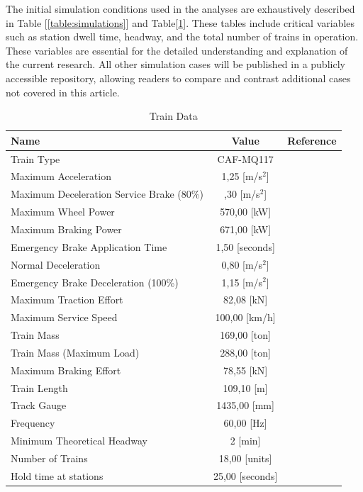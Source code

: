 \documentclass[conference]{IEEEtran}
\begin{document}
The initial simulation conditions used in the analyses are exhaustively described in Table [\ref{table:simulations}] and Table[\ref{table:train_data}]. These tables include critical variables such as station dwell time, headway, and the total number of trains in operation. These variables are essential for the detailed understanding and explanation of the current research. All other simulation cases will be published in a publicly accessible repository, allowing readers to compare and contrast additional cases not covered in this article.\cite{b12} 
\begin{table}[h]
\caption{Train Data}
\label{table:train_data}
\centering
\begin{tabular}{|p{4.5cm}|c|c|}
\hline
\rowcolor[gray]{0.9}
\centering Name & Value & \scriptsize Reference \\ 
\hline
Train Type & \scriptsize CAF-MQ117 & \cite{b10} \\
\hline
Maximum Acceleration & 1,25 [\scriptsize m/s$^2$]  & \cite{b11}  \\
\hline
Maximum Deceleration Service Brake \scriptsize(80\%)  & \centering 1,30 [\scriptsize m/s$^2$] & \cite{b11} \\
\hline
Maximum Wheel Power  & 570,00 [\scriptsize kW] & \cite{b12} \\
\hline
Maximum Braking Power  & 671,00 [\scriptsize kW] & \cite{b12} \\
\hline
Emergency Brake Application Time  & 1,50 [\scriptsize seconds] & \cite{b11} \\
\hline
Normal Deceleration & 0,80 [\scriptsize m/s$^2$]  & \cite{b11} \\
\hline
Emergency Brake Deceleration \scriptsize(100\%) & 1,15 [\scriptsize m/s$^2$]  & \cite{b11} \\
\hline
Maximum Traction Effort  & 82,08 [\scriptsize kN] & \cite{b12} \\
\hline
Maximum Service Speed & 100,00 [\scriptsize km/h] & \cite{b11} \\
\hline
Train Mass & 169,00 [\scriptsize ton]& \cite{b11} \\
\hline
Train Mass (Maximum Load) & 288,00 [\scriptsize ton] & \cite{b11} \\
\hline
Maximum Braking Effort & 78,55 [\scriptsize kN] & \cite{b12} \\
\hline
Train Length & 109,10 [\scriptsize m] & \cite{b11} \\
\hline
Track Gauge & 1435,00 \scriptsize[mm] & \cite{b11} \\
\hline
Frequency  & 60,00 \scriptsize[Hz] & \cite{b13} \\
\hline
Minimum Theoretical Headway  & 2 [\scriptsize min]& \cite{b14} \\
\hline
Number of Trains  & 18,00 [\scriptsize units] & \cite{b14} \\
\hline
Hold time at stations & 25,00 [\scriptsize seconds] & \cite{b15} \\
\hline
\end{tabular}
\end{table}
\end{document}
